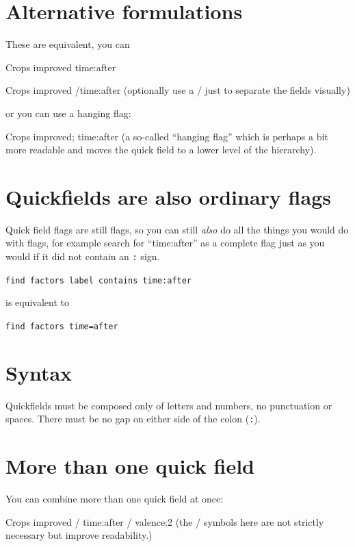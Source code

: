 \documentclass[
]{book}
\begin{document}
\hypertarget{alternative-formulations}{%
\section{Alternative formulations}\label{alternative-formulations}}

These are equivalent, you can

Crops improved time:after

Crops improved /time:after (optionally use a / just to separate the fields visually)

or you can use a hanging flag:

Crops improved; time:after (a so-called ``hanging flag'' which is perhaps a bit more readable and moves the quick field to a lower level of the hierarchy).

\hypertarget{quickfields-are-also-ordinary-flags}{%
\section{Quickfields are also ordinary flags}\label{quickfields-are-also-ordinary-flags}}

Quick field flags are still flags, so you can still \emph{also} do all the things you would do with flags, for example search for ``time:after'' as a complete flag just as you would if it did not contain an \texttt{:} sign.

\texttt{find\ factors\ label\ contains\ time:after}

is equivalent to

\texttt{find\ factors\ time=after}

\hypertarget{syntax}{%
\section{Syntax}\label{syntax}}

Quickfields must be composed only of letters and numbers, no punctuation or spaces. There must be no gap on either side of the colon (\texttt{:}).

\hypertarget{more-than-one-quick-field}{%
\section{More than one quick field}\label{more-than-one-quick-field}}

You can combine more than one quick field at once:

Crops improved / time:after / valence:2 (the / symbols here are not strictly necessary but improve readability.)
\end{document}
